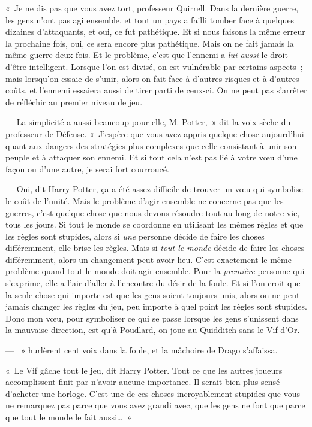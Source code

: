 «~Je ne dis pas que vous avez tort, professeur Quirrell.
Dans la dernière guerre, les gens n'ont pas agi ensemble, et tout un pays a failli tomber face à quelques dizaines d'attaquants, et oui, ce fut pathétique.
Et si nous faisons la même erreur la prochaine fois, oui, ce sera encore plus pathétique.
Mais on ne fait jamais la même guerre deux fois.
Et le problème, c'est que l'ennemi a \emph{lui aussi} le droit d'être intelligent.
Lorsque l'on est divisé, on est vulnérable par certains aspects~; mais lorsqu'on essaie de s'unir, alors on fait face à d'autres risques et à d'autres coûts, et l'ennemi essaiera aussi de tirer parti de ceux-ci.
On ne peut pas s'arrêter de réfléchir au premier niveau de jeu.

--- La simplicité a aussi beaucoup pour elle, M. Potter,~» dit la voix sèche du professeur de Défense.
«~J'espère que vous avez appris quelque chose aujourd'hui quant aux dangers des stratégies plus complexes que celle consistant à unir son peuple et à attaquer son ennemi.
Et si tout cela n'est pas lié à votre vœu d'une façon ou d'une autre, je serai fort courroucé.

--- Oui, dit Harry Potter, ça a été assez difficile de trouver un vœu qui symbolise le coût de l'unité.
Mais le problème d'agir ensemble ne concerne pas que les guerres, c'est quelque chose que nous devons résoudre tout au long de notre vie, tous les jours.
Si tout le monde se coordonne en utilisant les mêmes règles et que les règles sont stupides, alors si \emph{une} personne décide de faire les choses différemment, elle brise les règles.
Mais si \emph{tout le monde} décide de faire les choses différemment, alors un changement peut avoir lieu.
C'est exactement le même problème quand tout le monde doit agir ensemble.
Pour la \emph{première} personne qui s'exprime, elle a l'air d'aller à l'encontre du désir de la foule.
Et si l'on croit que la seule chose qui importe est que les gens soient toujours unis, alors on ne peut jamais changer les règles du jeu, peu importe à quel point les règles sont stupides.
Donc mon vœu, pour symboliser ce qui se passe lorsque les gens s'unissent dans la mauvaise direction, est qu'à Poudlard, on joue au Quidditch sans le Vif d'Or.

--- ~» hurlèrent cent voix dans la foule, et la mâchoire de Drago s'affaissa.

«~Le Vif gâche tout le jeu, dit Harry Potter.
Tout ce que les autres joueurs accomplissent finit par n'avoir aucune importance.
Il serait bien plus sensé d'acheter une horloge.
C'est une de ces choses incroyablement stupides que vous ne remarquez pas parce que vous avez grandi avec, que les gens ne font que parce que tout le monde le fait aussi…~»

